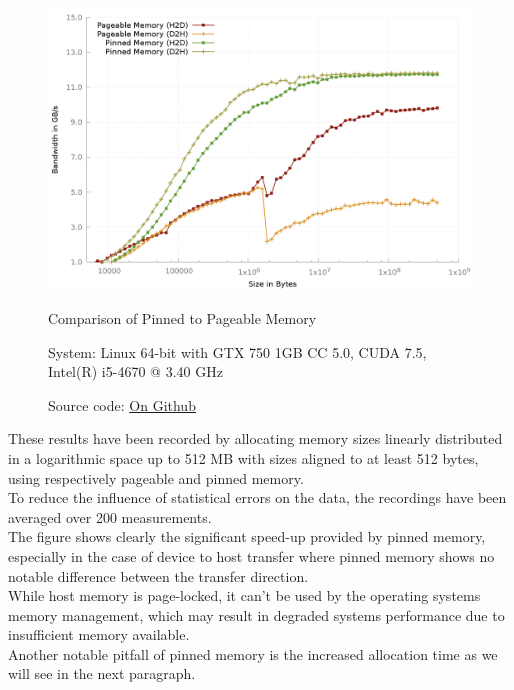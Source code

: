 \begin{figure}[ht]
    \centering
    \includegraphics[scale=0.35,natwidth=1200,natheight=800]{media/bandwidth_both.png}
    \caption{Comparison of Pinned to Pageable Memory}
    \caption*{System: Linux 64-bit with GTX 750 1GB CC 5.0, CUDA 7.5, Intel(R) i5-4670 @ 3.40 GHz}
    \caption*{Source code: \href{https://github.com/spotlight0xff/cuda\_paper/code/bandwidth}{On Github}}
    \label{fig:bandwidth}
\end{figure}
These results have been recorded by allocating memory sizes linearly distributed in a logarithmic space up to 512 MB with sizes aligned to at least 512 bytes, using respectively pageable and pinned memory.\\
To reduce the influence of statistical errors on the data, the recordings have been averaged over 200 measurements.\\
The figure shows clearly the significant speed-up provided by pinned memory, especially in the case of device to host transfer
where pinned memory shows no notable difference between the transfer direction.\\

While host memory is page-locked, it can't be used by the operating systems memory management,
which may result in degraded systems performance due to insufficient memory available.\\
Another notable pitfall of pinned memory is the increased allocation time as we will see in the next paragraph.\\

